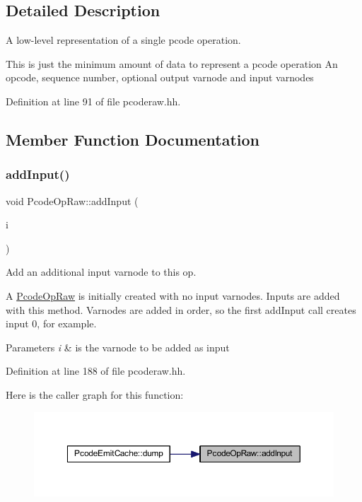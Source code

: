 \subsection{Detailed Description}
A low-\/level representation of a single pcode operation. 

This is just the minimum amount of data to represent a pcode operation An opcode, sequence number, optional output varnode and input varnodes 

Definition at line 91 of file pcoderaw.\+hh.



\subsection{Member Function Documentation}
\mbox{\label{class_pcode_op_raw_acd56b621ed3037ffa2cd015ca77406c0}} 
\subsubsection{\texorpdfstring{addInput()}{addInput()}}
{\footnotesize\ttfamily void Pcode\+Op\+Raw\+::add\+Input (\begin{DoxyParamCaption}\item[{\mbox{\hyperlink{struct_varnode_data}{Varnode\+Data}} $\ast$}]{i }\end{DoxyParamCaption})\hspace{0.3cm}{\ttfamily [inline]}}



Add an additional input varnode to this op. 

A \mbox{\hyperlink{class_pcode_op_raw}{Pcode\+Op\+Raw}} is initially created with no input varnodes. Inputs are added with this method. Varnodes are added in order, so the first add\+Input call creates input 0, for example. 
\begin{DoxyParams}{Parameters}
{\em i} & is the varnode to be added as input \\
\hline
\end{DoxyParams}


Definition at line 188 of file pcoderaw.\+hh.

Here is the caller graph for this function\+:
\nopagebreak
\begin{figure}[H]
\begin{center}
\leavevmode
\includegraphics[width=350pt]{class_pcode_op_raw_acd56b621ed3037ffa2cd015ca77406c0_icgraph}
\end{center}
\end{figure}
\mbox{\label{class_pcode_op_raw_ac9a26e03c83c2e057f90010d350be391}} 

